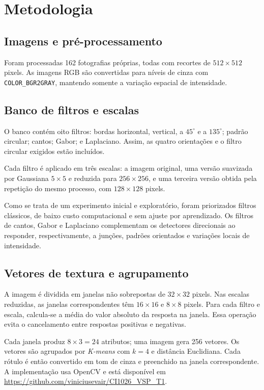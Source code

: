 \section{Metodologia}

\subsection{Imagens e pré-processamento}

Foram processadas 162 fotografias próprias, todas com recortes de $512 \times 512$ pixels. As imagens RGB são convertidas para níveis de cinza com \texttt{COLOR\_BGR2GRAY}, mantendo somente a variação espacial de intensidade.

\subsection{Banco de filtros e escalas}

O banco contém oito filtros: bordas horizontal, vertical, a $45^\circ$ e a $135^\circ$; padrão circular; cantos; Gabor; e Laplaciano. Assim, as quatro orientações e o filtro circular exigidos estão incluídos.

Cada filtro é aplicado em três escalas: a imagem original, uma versão suavizada por Gaussiana $5 \times 5$ e reduzida para $256 \times 256$, e uma terceira versão obtida pela repetição do mesmo processo, com $128 \times 128$ pixels.

Como se trata de um experimento inicial e exploratório, foram priorizados filtros clássicos, de baixo custo computacional e sem ajuste por aprendizado. Os filtros de cantos, Gabor e Laplaciano complementam os detectores direcionais ao responder, respectivamente, a junções, padrões orientados e variações locais de intensidade.

\subsection{Vetores de textura e agrupamento}

A imagem é dividida em janelas não sobrepostas de $32 \times 32$ pixels. Nas escalas reduzidas, as janelas correspondentes têm $16 \times 16$ e $8 \times 8$ pixels. Para cada filtro e escala, calcula-se a média do valor absoluto da resposta na janela. Essa operação evita o cancelamento entre respostas positivas e negativas.

Cada janela produz $8 \times 3 = 24$ atributos; uma imagem gera 256 vetores. Os vetores são agrupados por \textit{K-means} com $k=4$ e distância Euclidiana. Cada rótulo é então convertido em tom de cinza e preenchido na janela correspondente. A implementação usa OpenCV \cite{opencv} e está disponível em \url{https://github.com/viniciusevair/CI1026_VSP_T1}.
